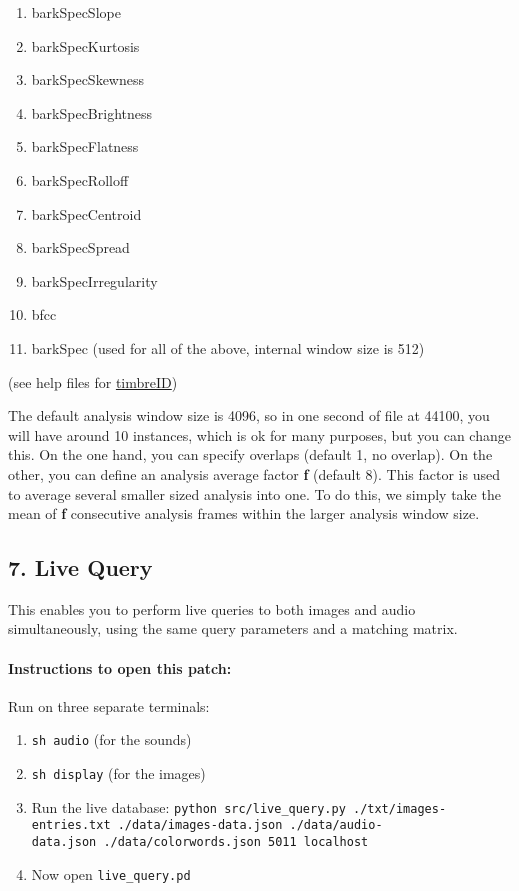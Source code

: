 \begin{enumerate}
\def\labelenumi{\arabic{enumi}.}
  \singlespacing
  \singlespacing
\tightlist
\item
  barkSpecSlope
\item
  barkSpecKurtosis
\item
  barkSpecSkewness
\item
  barkSpecBrightness
\item
  barkSpecFlatness
\item
  barkSpecRolloff
\item
  barkSpecCentroid
\item
  barkSpecSpread
\item
  barkSpecIrregularity
\item
  bfcc
\item
  barkSpec (used for all of the above, internal window size is 512)
\end{enumerate}

(see help files for \href{https://github.com/wbrent/timbreID}{timbreID})

The default analysis window size is 4096, so in one second of file at 44100, you will have around 10 instances, which is ok for many purposes, but you can change this. On the one hand, you can specify overlaps (default 1, no overlap). On the other, you can define an analysis average factor \textbf{f} (default 8). This factor is used to average several smaller sized analysis into one. To do this, we simply take the mean of \textbf{f} consecutive analysis frames within the larger analysis window size.



\subsection*{7. Live Query}

This enables you to perform live queries to both images and audio simultaneously, using the same query parameters and a matching matrix.


\paragraph{Instructions to open this patch:}

Run on three separate terminals:

\begin{enumerate}
\def\labelenumi{\arabic{enumi}.}
  \singlespacing
\tightlist
\item
  \texttt{sh\ audio} (for the sounds)
\item
  \texttt{sh\ display} (for the images)
\item
  Run the live database: \texttt{python\ src/live\_query.py\ ./txt/images-entries.txt\ ./data/images-data.json\ ./data/audio-data.json\ ./data/colorwords.json\ 5011\ localhost}
\item
  Now open \texttt{live\_query.pd}
\end{enumerate}


